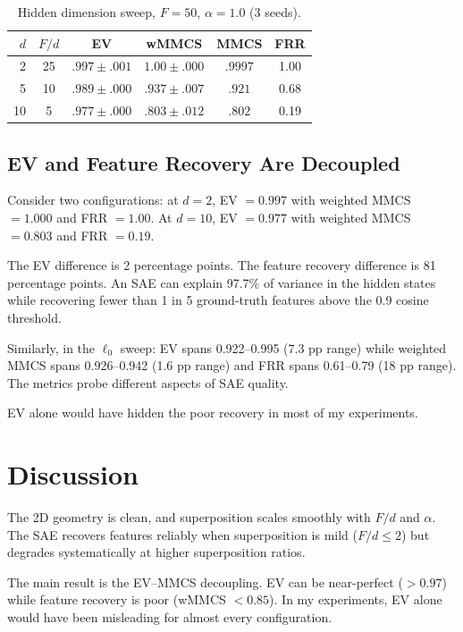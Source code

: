 \documentclass[10pt,twocolumn]{article}
\begin{document}
\begin{table}[h]
\caption{Hidden dimension sweep, $F{=}50$, $\alpha{=}1.0$ (3 seeds).}
\label{tab:dsweep}
\centering
\small
\begin{tabular}{rccccc}
\toprule
$d$ & $F/d$ & EV & wMMCS & MMCS & FRR \\
\midrule
2  & 25 & $.997 \pm .001$ & $\mathbf{1.00} \pm .000$ & $.9997$ & 1.00 \\
5  & 10 & $.989 \pm .000$ & $.937 \pm .007$ & $.921$  & 0.68 \\
10 & 5  & $.977 \pm .000$ & $.803 \pm .012$ & $.802$  & 0.19 \\
\bottomrule
\end{tabular}
\end{table}

\subsection{EV and Feature Recovery Are Decoupled}
\label{sec:decoupled}

Consider two configurations:
at $d{=}2$, EV $= 0.997$ with weighted MMCS $= 1.000$ and FRR $= 1.00$.
At $d{=}10$, EV $= 0.977$ with weighted MMCS $= 0.803$ and FRR $= 0.19$.

The EV difference is 2 percentage points. The feature recovery difference is
81 percentage points. An SAE can explain 97.7\% of variance in the hidden states
while recovering fewer than 1 in 5 ground-truth features above the 0.9 cosine
threshold.

Similarly, in the $\ell_0$ sweep: EV spans 0.922--0.995 (7.3 pp range) while
weighted MMCS spans 0.926--0.942 (1.6 pp range) and FRR spans 0.61--0.79
(18 pp range). The metrics probe different aspects of SAE quality.

EV alone would have hidden the poor recovery in most of my experiments.

\section{Discussion}
\label{sec:discussion}

The 2D geometry is clean, and superposition scales smoothly with $F/d$ and $\alpha$. The SAE
recovers features reliably when superposition is mild ($F/d \leq 2$) but
degrades systematically at higher superposition ratios.

The main result is the EV--MMCS decoupling. EV can be near-perfect ($> 0.97$) while feature recovery is poor (wMMCS $< 0.85$). In my experiments, EV alone would have been misleading for almost every configuration.
\end{document}
